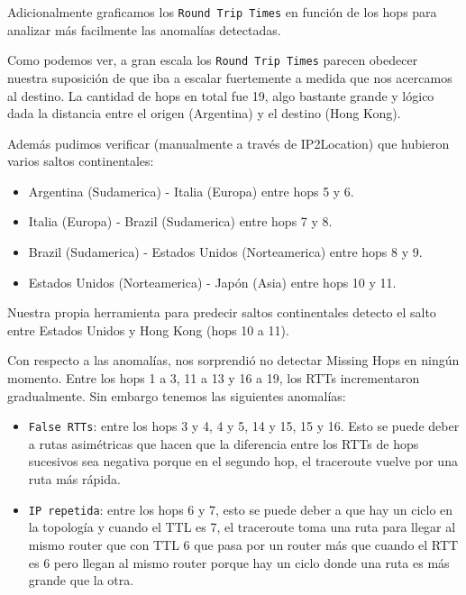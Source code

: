 Adicionalmente graficamos los \texttt{Round Trip Times} en función de los hops para analizar más facilmente las anomalías detectadas.

\begin{figure}[H]
    \centering
\end{figure}

Como podemos ver, a gran escala los \texttt{Round Trip Times} parecen obedecer nuestra suposición de que iba a escalar fuertemente a medida que nos acercamos al destino. La cantidad de hops en total fue 19, algo bastante grande y lógico dada la distancia entre el origen (Argentina) y el destino (Hong Kong).

Además pudimos verificar (manualmente a través de IP2Location) que hubieron varios saltos continentales:
\begin{itemize}
\item Argentina (Sudamerica) - Italia (Europa) entre hops 5 y 6.
\item Italia (Europa) - Brazil (Sudamerica) entre hops 7 y 8.
\item Brazil (Sudamerica) - Estados Unidos (Norteamerica) entre hops 8 y 9.
\item Estados Unidos (Norteamerica) - Japón (Asia) entre hops 10 y 11.
\end{itemize}
Nuestra propia herramienta para predecir saltos continentales detecto el salto entre Estados Unidos y Hong Kong (hops 10 a 11).

Con respecto a las anomalías, nos sorprendió no detectar Missing Hops en ningún momento. Entre los hops 1 a 3, 11 a 13 y 16 a 19, los RTTs incrementaron gradualmente. Sin embargo tenemos las siguientes anomalías:

\begin{itemize}
\item \texttt{False RTTs}: entre los hops 3 y 4, 4 y 5, 14 y 15, 15 y 16. Esto se puede deber a rutas asimétricas que hacen que la diferencia entre los RTTs de hops sucesivos sea negativa porque en el segundo hop, el traceroute vuelve por una ruta más rápida.
\item \texttt{IP repetida}: entre los hops 6 y 7, esto se puede deber a que hay un ciclo en la topología y cuando el TTL es 7, el traceroute toma una ruta para llegar al mismo router que con TTL 6 que pasa por un router más que cuando el RTT es 6 pero llegan al mismo router porque hay un ciclo donde una ruta es más grande que la otra.
\end{itemize}
